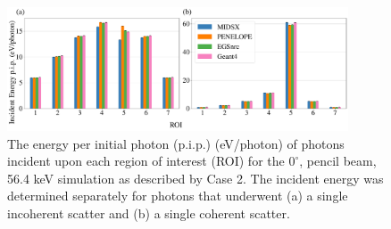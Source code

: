 
\begin{figure}[p]
    \centering
	\includegraphics[width=0.90\textwidth]{../figures/ROI_0_deg__pencil_paper_ready_wo_mutiple.pdf}
	\caption{The energy per initial photon (p.i.p.) (eV/photon) of photons incident upon each region of interest (ROI) for the $0^\circ$, pencil beam, 56.4 keV simulation as described by Case 2. The incident energy was determined separately for photons that underwent (a) a single incoherent scatter and (b) a single coherent scatter.}
	\label{fig:ROIPGraph}
\end{figure}



